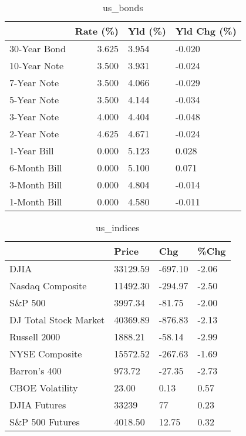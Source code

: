 \documentclass{article}%
\begin{document}
%


\begin{table}[htbp]%
\caption{us\_bonds}%
\centering%
\begin{adjustbox}{width=1\textwidth}%
\begin{tabular}{lrll}
\toprule
             &  Rate (\%) & Yld (\%) & Yld Chg (\%) \\
\midrule
30-Year Bond &     3.625 &   3.954 &      -0.020 \\
10-Year Note &     3.500 &   3.931 &      -0.024 \\
 7-Year Note &     3.500 &   4.066 &      -0.029 \\
 5-Year Note &     3.500 &   4.144 &      -0.034 \\
 3-Year Note &     4.000 &   4.404 &      -0.048 \\
 2-Year Note &     4.625 &   4.671 &      -0.024 \\
 1-Year Bill &     0.000 &   5.123 &       0.028 \\
6-Month Bill &     0.000 &   5.100 &       0.071 \\
3-Month Bill &     0.000 &   4.804 &      -0.014 \\
1-Month Bill &     0.000 &   4.580 &      -0.011 \\
\bottomrule
\end{tabular}
%
\end{adjustbox}%
\end{table}

%


\begin{table}[htbp]%
\caption{us\_indices}%
\centering%
\begin{adjustbox}{width=1\textwidth}%
\begin{tabular}{llll}
\toprule
                      &    Price &     Chg &  \%Chg \\
\midrule
                 DJIA & 33129.59 & -697.10 & -2.06 \\
     Nasdaq Composite & 11492.30 & -294.97 & -2.50 \\
              S\&P 500 &  3997.34 &  -81.75 & -2.00 \\
DJ Total Stock Market & 40369.89 & -876.83 & -2.13 \\
         Russell 2000 &  1888.21 &  -58.14 & -2.99 \\
       NYSE Composite & 15572.52 & -267.63 & -1.69 \\
         Barron's 400 &   973.72 &  -27.35 & -2.73 \\
      CBOE Volatility &    23.00 &    0.13 &  0.57 \\
         DJIA Futures &    33239 &      77 &  0.23 \\
      S\&P 500 Futures &  4018.50 &   12.75 &  0.32 \\
\bottomrule
\end{tabular}
%
\end{adjustbox}%
\end{table}
\end{document}

